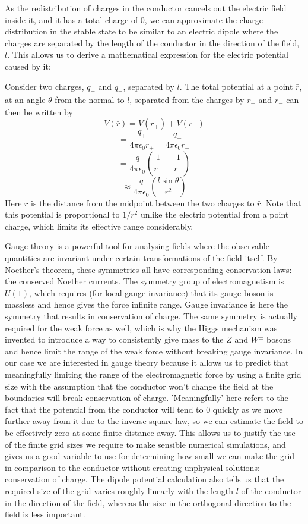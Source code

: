 \documentclass[aps,twocolumn,pre,nofootinbib]{revtex4-1}
\begin{document}
As the redistribution of charges in the conductor cancels out the electric field inside it, and it has a total charge of 0, we can approximate the charge distribution in the stable state to be similar to an electric dipole where the charges are separated by the length of the conductor in the direction of the field, $l$. This allows us to derive a mathematical expression for the electric potential caused by it:

Consider two charges, $q_+$ and $q_-$, separated by $l$. The total potential at a point $\bar{r}$, at an angle $\theta$ from the normal to $l$, separated from the charges by $r_+$ and $r_-$ can then be written by
\[V(\bar{r}) = V(r_+) + V(r_-) \]
\[ = \frac{q_+}{4 \pi \epsilon_0 r_+} + \frac{q_-}{4 \pi \epsilon_0 r_-} \]
\[ = \frac{q}{4 \pi \epsilon_0}\left( \frac{1}{r_+} - \frac{1}{r_-} \right) \]
\[ \approx \frac{q}{4 \pi \epsilon_0} \left( \frac{l \sin\theta}{r^2} \right) \]
Here $r$ is the distance from the midpoint between the two charges to $\bar{r}$. Note that this potential is proportional to $1/r^2$ unlike the electric potential from a point charge, which limits its effective range considerably.

Gauge theory is a powerful tool for analysing fields where the observable quantities are invariant under certain transformations of the field itself. By Noether's theorem, these symmetries all have corresponding conservation laws: the conserved Noether currents. The symmetry group of electromagnetism is $U(1)$, which requires (for local gauge invariance) that its gauge boson is massless and hence gives the force infinite range. Gauge invariance is here the symmetry that results in conservation of charge. The same symmetry is actually required for the weak force as well, which is why the Higgs mechanism was invented to introduce a way to consistently give mass to the $Z$ and $W^{\pm}$ bosons and hence limit the range of the weak force without breaking gauge invariance. In our case we are interested in gauge theory because it allows us to predict that meaningfully limiting the range of the electromagnetic force by using a finite grid size with the assumption that the conductor won't change the field at the 
boundaries will break conservation of charge. 'Meaningfully' here refers to the fact that the potential from the conductor will tend to 0 quickly as we move further away from it due to the inverse square law, so we can estimate the field to be effectively zero at some finite distance away. This allows us to justify the use of the finite grid sizes we require to make sensible numerical simulations, and gives us a good variable to use for determining how small we can make the grid in comparison to the conductor without creating unphysical solutions: conservation of charge. The dipole potential calculation also tells us that the required size of the grid varies roughly linearly with the length $l$ of the conductor in the direction of the field, whereas the size in the orthogonal direction to the field is less important.
\end{document}
